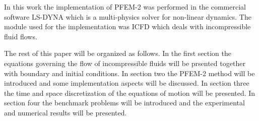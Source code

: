 In this work the implementation of PFEM-2 was performed in the commercial software LS-DYNA\textsuperscript{\textregistered} which is a multi-physics solver for non-linear dynamics. The module used for the implementation was ICFD which deals with incompressible fluid flows. 

The rest of this paper will be organized as follows. 
In the first section the equations governing the flow of incompressible fluids will be prsented together with boundary and initial conditions. 
In section two the PFEM-2 method will be introduced and some implementation aspects will be discussed.
In section three the time and space discretization of the equations of motion will be presented. 
In section four the benchmark problems will be introduced and the experimental and numerical results will be presented.

